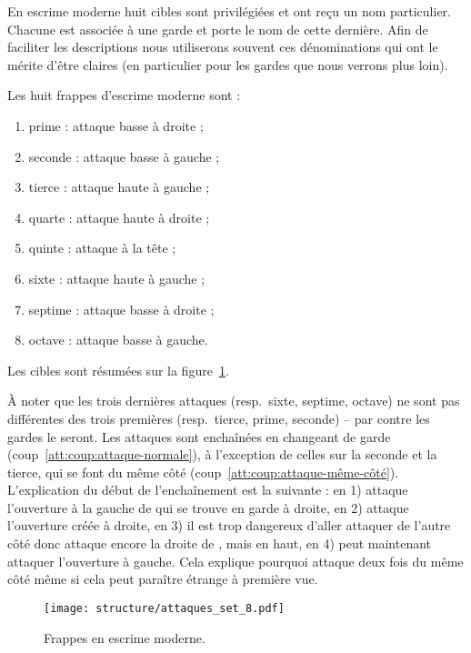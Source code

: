 En escrime moderne huit cibles sont privilégiées et ont reçu un nom particulier.
Chacune est associée à une garde et porte le nom de cette dernière.
Afin de faciliter les descriptions nous utiliserons souvent ces dénominations qui ont le mérite d'être claires (en particulier pour les gardes que nous verrons plus loin).


\begin{coup}
\label{att:coup:série-8}

\noindent
Les huit frappes d'escrime moderne sont :
\begin{enumerate}
	\item prime : attaque basse à droite ;
	\item seconde : attaque basse à gauche ;
	\item tierce : attaque haute à gauche ;
	\item quarte : attaque haute à droite ;
	\item quinte : attaque à la tête ;
	\item sixte : attaque haute à gauche ;
	\item septime : attaque basse à droite ;
	\item octave : attaque basse à gauche.
\end{enumerate}

Les cibles sont résumées sur la figure~\ref{att:fig:série-8}.
\end{coup}


À noter que les trois dernières attaques (resp.\ sixte, septime, octave) ne sont pas différentes des trois premières (resp.\ tierce, prime, seconde) -- par contre les gardes le seront.
Les attaques sont enchaînées en changeant de garde (coup~\ref{att:coup:attaque-normale}), à l'exception de celles sur la seconde et la tierce, qui se font du même côté (coup~\ref{att:coup:attaque-même-côté}).
L'explication du début de l'enchaînement est la suivante : en 1) \A attaque l'ouverture à la gauche de \D qui se trouve en garde à droite, en 2) \A attaque l'ouverture créée à droite, en 3) il est trop dangereux d'aller attaquer de l'autre côté donc \A attaque encore la droite de \D, mais en haut, en 4) \A peut maintenant attaquer l'ouverture à gauche.
Cela explique pourquoi \A attaque deux fois du même côté même si cela peut paraître étrange à première vue.


\begin{figure}[ht]
	\centering
	\texttt{[image: structure/attaques\_set\_8.pdf]}
	\caption{Frappes en escrime moderne.}
	\label{att:fig:série-8}
\end{figure}


